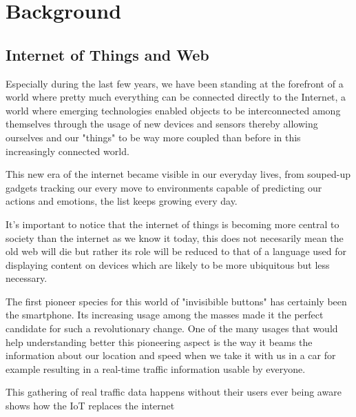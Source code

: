 \chead{}
\chapter{Background}

\section{Internet of Things and Web}


Especially during the last few years, we have been standing at the forefront of a world where pretty much everything can be connected directly to the Internet, a world where emerging technologies enabled objects to be interconnected among themselves through the usage of new devices and sensors thereby allowing ourselves and our "things" to be way more coupled than before in this increasingly connected world.

This new era of the internet became visible in our everyday lives, from souped-up gadgets tracking our every move to environments capable of predicting our actions and emotions,  the list keeps growing every day.

It's important to notice that the internet of things is becoming more central to society than the internet as we know it today, this does not necesarily mean the old web will die but rather its role will be reduced to that of a language used for displaying content on devices which are likely to be more ubiquitous but less necessary.

The first pioneer species for this world of "invisibible buttons" has certainly been the smartphone. Its increasing usage among the masses made it the perfect candidate for such a revolutionary change. One of the many usages that would help understanding better this pioneering aspect is the way it beams the information about our location and speed when we take it with us in a car for example resulting in a real-time traffic information usable by everyone.

This gathering of real traffic data happens without their users ever being aware shows how the IoT replaces the internet

